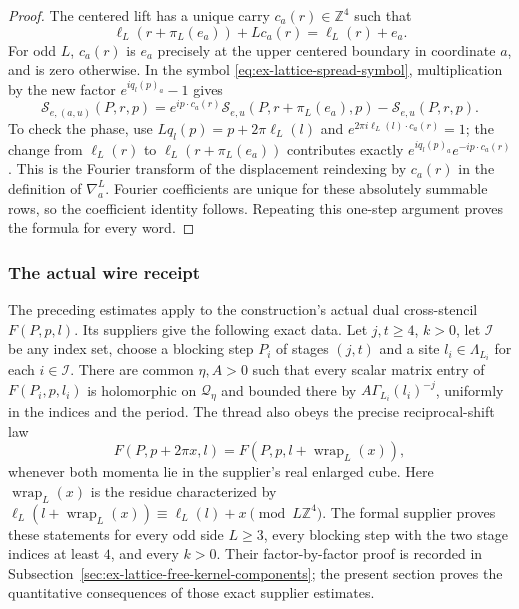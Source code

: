 \begin{proof}
The centered lift has a unique carry $c_a(r)\in\mathbb Z^4$ such that
\[
 \ell_L(r+\pi_L(e_a))+Lc_a(r)=\ell_L(r)+e_a.
\]
For odd $L$, $c_a(r)$ is $e_a$ precisely at the upper centered boundary in
coordinate $a$, and is zero otherwise. In the symbol
\eqref{eq:ex-lattice-spread-symbol}, multiplication by the new factor
$e^{iq_l(p)_a}-1$ gives
\[
 \mathcal S_{e,(a,u)}(P,r,p)
 =e^{ip\cdot c_a(r)}\mathcal S_{e,u}(P,r+\pi_L(e_a),p)
      -\mathcal S_{e,u}(P,r,p).
\]
To check the phase, use $Lq_l(p)=p+2\pi\ell_L(l)$ and
$e^{2\pi i\ell_L(l)\cdot c_a(r)}=1$; the change from
$\ell_L(r)$ to $\ell_L(r+\pi_L(e_a))$ contributes exactly
$e^{iq_l(p)_a}e^{-ip\cdot c_a(r)}$. This is the Fourier transform of
the displacement reindexing by $c_a(r)$ in the definition of
$\nabla_a^L$. Fourier coefficients are unique for these absolutely summable
rows, so the coefficient identity follows. Repeating this one-step argument
proves the formula for every word.
\end{proof}

\subsubsection{The actual wire receipt}

The preceding estimates apply to the construction's actual dual
cross-stencil $F(P,p,l)$. Its suppliers give the following exact data. Let
$j,t\geq4$, $k>0$, let
$\mathcal I$ be any index set, choose a blocking step $P_i$ of stages
$(j,t)$ and a site $l_i\in\Lambda_{L_i}$ for each $i\in\mathcal I$.
There are common $\eta,A>0$ such that every scalar matrix entry of
$F(P_i,p,l_i)$ is holomorphic on $\mathcal Q_\eta$ and bounded there by
$A\Gamma_{L_i}(l_i)^{-j}$, uniformly in the indices and the period. The
thread also obeys the precise reciprocal-shift law
\begin{equation}
 F(P,p+2\pi x,l)=F(P,p,l+\operatorname{wrap}_L(x)),
 \label{eq:ex-lattice-wire-overlap}
\end{equation}
whenever both momenta lie in the supplier's real enlarged cube. Here
$\operatorname{wrap}_L(x)$ is the residue characterized by
$\ell_L(l+\operatorname{wrap}_L(x))\equiv\ell_L(l)+x\pmod{L\mathbb Z^4}$.
The formal supplier proves these statements for every odd side $L\geq3$,
every blocking step with the two stage indices at least $4$, and every $k>0$.
Their factor-by-factor proof is recorded in
Subsection~\ref{sec:ex-lattice-free-kernel-components}; the present section
proves the quantitative consequences of those exact supplier estimates.

